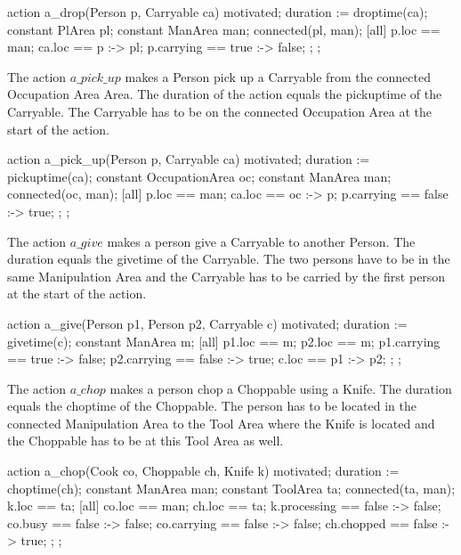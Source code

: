 \begin{anmlcode}
action a_drop(Person p, Carryable ca) {
  motivated;
  duration := droptime(ca);
  constant PlArea pl;
  constant ManArea man;
  connected(pl, man);
  [all] {
    p.loc == man;
    ca.loc == p :-> pl;
    p.carrying == true :-> false;
  };
};
\end{anmlcode}

The action $a\_pick\_up$ makes a Person pick up a Carryable from the connected Occupation Area Area.
The duration of the action equals the pickuptime of the Carryable.
The Carryable has to be on the connected Occupation Area at the start of the action.

\begin{anmlcode}
action a_pick_up(Person p, Carryable ca) {
  motivated;
  duration := pickuptime(ca);
  constant OccupationArea oc;
  constant ManArea man;
  connected(oc, man);
  [all] {
    p.loc == man;
    ca.loc == oc :-> p; 
    p.carrying == false :-> true;
  };
};
\end{anmlcode}

The action $a\_give$ makes a person give a Carryable to another Person.
The duration equals the givetime of the Carryable.
The two persons have to be in the same Manipulation Area and the Carryable has to be carried by the first person at the start of the action.

\begin{anmlcode}
action a_give(Person p1, Person p2, Carryable c) {
  motivated;
  duration := givetime(c);
  constant ManArea m;
  [all] {
    p1.loc == m;
    p2.loc == m;
    p1.carrying == true :-> false;
    p2.carrying == false :-> true;
    c.loc == p1 :-> p2;
  };
};
\end{anmlcode}

The action $a\_chop$ makes a person chop a Choppable using a Knife.
The duration equals the choptime of the Choppable.
The person has to be located in the connected Manipulation Area to the Tool Area where the Knife is located and the Choppable has to be at this Tool Area as well.

\begin{anmlcode}
action a_chop(Cook co, Choppable ch, Knife k) {
  motivated;
  duration := choptime(ch);
  constant ManArea man;
  constant ToolArea ta;
  connected(ta, man);
  k.loc == ta;
  [all] {
    co.loc == man;
    ch.loc == ta;
    k.processing == false :-> false;
    co.busy == false :-> false;
    co.carrying == false :-> false;
    ch.chopped == false :-> true;
  };
};
\end{anmlcode}

